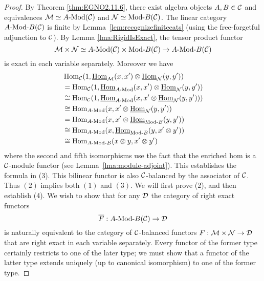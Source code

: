 \documentclass{amsart}
\begin{document}
\begin{proof}  
	 By Theorem \ref{thm:EGNO2.11.6}, there exist algebra objects $A, B \in \mathcal C$ and equivalences $\cM \simeq \Mod{A}{}(\cC)$ and $\cN \simeq \Mod{}{B}(\cC)$. The linear category $\Mod{A }{B}(\cC)$ is finite by Lemma~\ref{lem:recognizefinitecats} (using the free-forgetful adjunction to $\mathcal C$).
	 By Lemma \ref{lma:RigidIsExact}, the tensor product functor
	\begin{equation*}
		\cM \times \cN \simeq \Mod{A}{}(\cC) \times  \Mod{}{B}(\cC) \to \Mod{A}{B}(\cC)
	\end{equation*}
	is exact in each variable separately. Moreover we have
	\begin{align*}
		&\Hom_{\cC}(1, \IHom_{\cM}(x,x') \otimes \IHom_{\cN}(y, y')) \\
		& = \Hom_{\cC}(1, \IHom_{\Mod{A}{}}(x,x') \otimes \IHom_{\cN}(y, y')) \\
		&\cong \Hom_{\cC}(1, \IHom_{\Mod{A}{}}(x,x' \otimes \IHom_{\cN}(y, y')) ) \\
		& \cong \Hom_{\Mod{A}{}}(x, x' \otimes \IHom_{\cN}(y, y') ) \\
		& = \Hom_{\Mod{A}{}}(x, x' \otimes \IHom_{\Mod{}{B}}(y, y') )\\
		& \cong \Hom_{\Mod{A}{}}(x,  \IHom_{\Mod{}{B}}(y, x' \otimes y') )\\
		& \cong \Hom_{\Mod{A}{B}}(x \otimes y, x' \otimes y')
	\end{align*} 
where the second and fifth isomorphisms use the fact that the enriched hom is a $\mathcal C$-module functor (see Lemma~\ref{lma:module-adjoint}). This establishes the formula in (3). This bilinear functor is also $\mathcal C$-balanced by the associator of $\mathcal C$. Thus $(2)$ implies both  $(1)$ and $(3)$. 
	We will first prove (2), and then establish (4).  We wish to show that for any $\mathcal D$ the category of right exact functors 
\begin{equation*}
	\overline{F}:\Mod{A}{B}(\cC) \to \cD
\end{equation*}
	is naturally equivalent to the category of $\mathcal C$-balanced functors $F:\mathcal M \times \mathcal N \to \mathcal D$ that are right exact in each variable separately. Every functor of the former type certainly restricts to one of the later type; we must show that a functor of the latter type extends uniquely (up to canonical isomorphism) to one of the former type.  
	

\end{proof}
\end{document}
